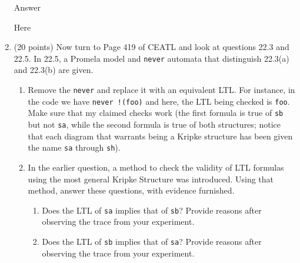 \documentclass[11pt]{article}
\begin{document}
\begin{enumerate}
\begin{minipage}{\minpagw}
{{      Answer

      Here
    }%
  }%
\end{minipage}

\clearpage
  


\item (20 points) 
  Now turn to Page 419 of CEATL and look at questions 22.3 and 22.5.
  In 22.5, a Promela model and {\tt never} automata
  that distinguish 22.3(a) and 22.3(b) are given.
  \begin{enumerate}
  \item Remove the {\tt never} and replace it with an equivalent LTL.
    For instance, in the code we have {\tt never !(foo)} and here,
    the LTL being checked is {\tt foo}.
    Make sure that my claimed checks work (the first formula is true
    of {\tt sb} but not {\tt sa}, while the second formula is true
    of both structures; notice that each diagram
    that warrants being a Kripke structure has been given the name
    {\tt sa} through {\tt sh}).

  \item In the earlier question,
    a method to check the validity of LTL
    formulas using the most general Kripke Structure was introduced.
    Using that method, answer these questions, with evidence furnished.
    \begin{enumerate}
    \item    Does the LTL of {\tt sa} implies that of {\tt sb}?
      Provide reasons after observing the trace from your experiment.
    \item    Does the LTL of {\tt sb} implies that of {\tt sa}?
      Provide reasons after observing the trace from your experiment.      
    \end{enumerate}
  \end{enumerate}




\begin{minipage}{\minpagw}
\end{minipage}
\end{enumerate}
\end{document}

